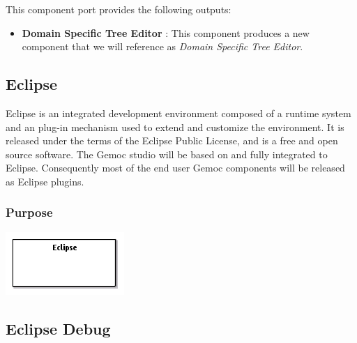 \documentclass{gemoc} %
\begin{document}
This component port provides the following outputs:
\begin{itemize}
  \item \textbf{Domain Specific Tree Editor} :
This component produces a new component that we will reference as \emph{Domain Specific Tree Editor}.
\end{itemize}


\subsection{Eclipse}
Eclipse is an integrated development environment composed of a runtime system and an plug-in mechanism used to extend and customize the environment. It is released under the terms of the Eclipse Public License, and is a free and open source software. The Gemoc studio will be based on and fully integrated to Eclipse. Consequently most of the end user Gemoc components will be released as Eclipse plugins.

\subsubsection{Purpose}


\begin{center}
\includegraphics*[trim=0.0cm 0.0cm 0cm 0.0cm, clip=true]{../images/generated/Generated_Eclipse.png}
\end{center}




\subsection{Eclipse Debug}

\end{document}
